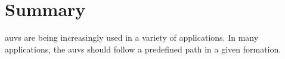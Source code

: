 \chapter*{Summary}

\glspl{auv} are being increasingly used in a variety of applications.
In many applications, the \glspl{auv} should follow a predefined path in a given formation.
